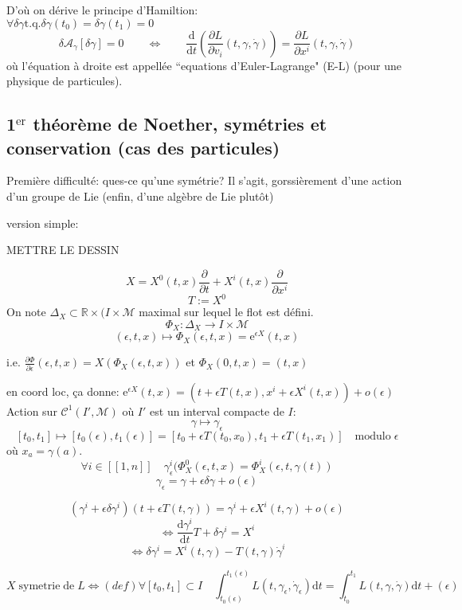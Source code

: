 \documentclass[a4paper,11pt]{article}
\renewcommand{\d}{{\mathrm{d}}}
\newcommand{\e}{{\mathrm{e}}}
\newcommand{\dr}[2]{\frac{\partial {#1}}{\partial{#2}}}
\begin{document}
D'où on dérive le principe d'Hamiltion:\\
$\forall \delta\gamma \mathrm{t}.\mathrm{q}. \delta\gamma(t_0)=\delta\gamma(t_1)=0$
\begin{equation*}
\delta\mathcal{A}_\gamma[\delta\gamma] = 0 \quad \quad \iff \quad \quad \boxed{\frac{\d}{\d t}\left(\dr{L}{v_i}(t,\gamma,\dot\gamma)\right) = \dr{L}{x^i}(t,\gamma,\dot\gamma)}
\end{equation*}
où l'équation à droite est appellée ``equations d'Euler-Lagrange" (E-L) (pour une physique de particules).

\subsection{1$^\mathrm{er}$ théorème de Noether, symétries et conservation (cas des particules)}
Première difficulté: ques-ce qu'une symétrie? Il s'agit, gorssièrement d'une action d'un groupe de Lie (enfin, d'une algèbre de Lie plutôt)

version simple:

METTRE LE DESSIN

$$X = X^0(t,x)\frac{\partial}{\partial t} + X^i(t,x) \frac{\partial}{\partial x^i}$$
$$T:=X^0$$
On note $\Delta_X\subset \mathbb{R}\times(I\times\mathcal{M}$ maximal sur lequel le flot est défini.
$$\Phi_X : \Delta_X \to I\times\mathcal{M}$$
$$(\epsilon,t,x)\mapsto \Phi_X(\epsilon,t,x)=\e^{\epsilon X}(t,x)$$

i.e. $\frac{\partial \Phi}{\partial \epsilon}(\epsilon, t, x) = X(\Phi_X(\epsilon, t, x))$ et $\Phi_X(0,t,x)=(t,x)$

en coord loc, ça donne: $\e^{\epsilon X}(t,x)=(t+\epsilon T(t,x),x^i+\epsilon X^i(t,x)) + o(\epsilon)$
Action sur $\mathcal{C}^1(I',\mathcal{M})$ où $I'$ est un interval compacte de $I$:
$$\gamma \mapsto \gamma_\epsilon$$
$$[t_0,t_1]\mapsto[t_0(\epsilon),t_1(\epsilon)]=[t_0+\epsilon T(t_0,x_0),t_1+\epsilon T(t_1,x_1)]\quad \mathrm{modulo}\;\epsilon$$
où $x_a = \gamma(a)$.
$$\forall i \in [\![1,n]\!] \quad \gamma^i_{\epsilon}(\Phi_X^0(\epsilon,t,x)=\Phi_X^i(\epsilon,t,\gamma(t))$$
$$\gamma_\epsilon = \gamma + \epsilon\delta\gamma + o(\epsilon)$$

$$(\gamma^i+\epsilon\delta\gamma^i)(t+\epsilon T(t,\gamma)) = \gamma^i + \epsilon X^i(t,\gamma) + o(\epsilon)$$
$$\iff \frac{\d \gamma^i}{\d t}T + \delta\gamma^i = X^i$$
$$\iff \boxed{\delta \gamma^i = X^i(t,\gamma) - T(t,\gamma)\dot\gamma^i}$$

$$X \; \mathrm{symetrie}\;\mathrm{de}\;L \iff(def) \forall [t_0,t_1]\subset I \quad \int_{t_0(\epsilon)}^{t_1(\epsilon)} L(t,\gamma_\epsilon, \dot\gamma_\epsilon)\d t = \int_{t_0}^{t_1} L(t,\gamma,\dot\gamma)\d t + (\epsilon)$$
\end{document}

